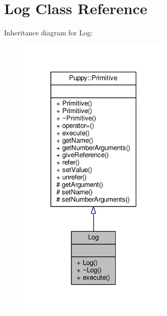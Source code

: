 \hypertarget{classLog}{}\section{Log Class Reference}
\label{classLog}


Inheritance diagram for Log\+:
\nopagebreak
\begin{figure}[H]
\begin{center}
\leavevmode
\includegraphics[width=207pt]{classLog__inherit__graph}
\end{center}
\end{figure}



